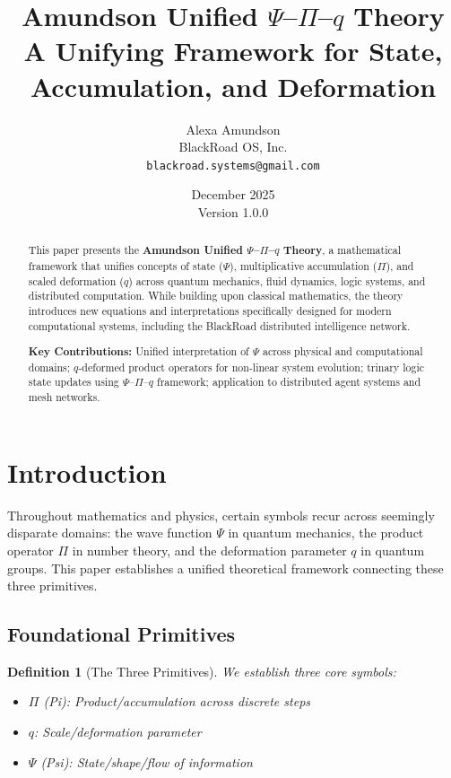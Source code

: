 \documentclass[12pt,a4paper]{article}
\title{\textbf{Amundson Unified $\Psi$--$\Pi$--$q$ Theory}\\
\large A Unifying Framework for State, Accumulation, and Deformation}
\author{Alexa Amundson\\
BlackRoad OS, Inc.\\
\texttt{blackroad.systems@gmail.com}}
\date{December 2025\\Version 1.0.0}
\newtheorem{definition}{Definition}
\begin{document}
\maketitle

\begin{abstract}
This paper presents the \textbf{Amundson Unified $\Psi$--$\Pi$--$q$ Theory}, a mathematical framework that unifies concepts of state ($\Psi$), multiplicative accumulation ($\Pi$), and scaled deformation ($q$) across quantum mechanics, fluid dynamics, logic systems, and distributed computation. While building upon classical mathematics, the theory introduces new equations and interpretations specifically designed for modern computational systems, including the BlackRoad distributed intelligence network.

\textbf{Key Contributions:} Unified interpretation of $\Psi$ across physical and computational domains; $q$-deformed product operators for non-linear system evolution; trinary logic state updates using $\Psi$--$\Pi$--$q$ framework; application to distributed agent systems and mesh networks.
\end{abstract}

\section{Introduction}

Throughout mathematics and physics, certain symbols recur across seemingly disparate domains: the wave function $\Psi$ in quantum mechanics, the product operator $\Pi$ in number theory, and the deformation parameter $q$ in quantum groups. This paper establishes a unified theoretical framework connecting these three primitives.

\subsection{Foundational Primitives}

\begin{definition}[The Three Primitives]
We establish three core symbols:
\begin{itemize}
\item $\Pi$ (Pi): Product/accumulation across discrete steps
\item $q$: Scale/deformation parameter
\item $\Psi$ (Psi): State/shape/flow of information
\end{itemize}
\end{definition}
\end{document}
